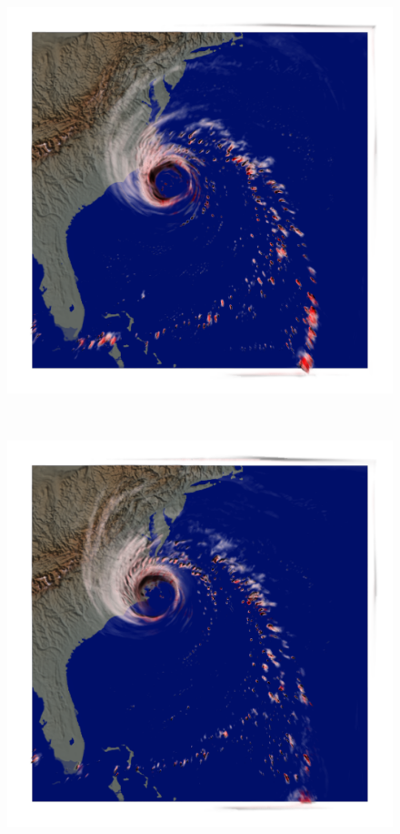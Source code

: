 \begin{figure}
\centering
\begin{minipage}{.33\textwidth}
	\includegraphics[width=1\linewidth]{figures/hurricane_hsba_0_10stdprecip_1-4cloud_precip_35}
	\subcaption{}
\end{minipage}~
\begin{minipage}{.33\textwidth}
	\includegraphics[width=1\linewidth]{figures/hurricane_hsba_0_10stdprecip_1-4cloud_precip_40}

\end{minipage}
\end{figure}
